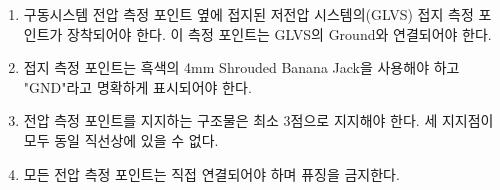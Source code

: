 \documentclass[final,a4paper,10pt]{report}
\begin{document}
\begin{enumerate}
  \item\label{rule:formula-technical.tractive-system-measuring-points.glvs-ground-point} 구동시스템 전압 측정 포인트 옆에 접지된 저전압 시스템의(GLVS) 접지 측정 포인트가 장착되어야 한다. 이 측정 포인트는 GLVS의 Ground와 연결되어야 한다.
  \item\label{rule:formula-technical.tractive-system-measuring-points.black-jack-gnd-label} 접지 측정 포인트는 흑색의 4mm Shrouded Banana Jack을 사용해야 하고 "GND"라고 명확하게 표시되어야 한다.
  \item\label{rule:formula-technical.tractive-system-measuring-points.min-3point-noncollinear-support} 전압 측정 포인트를 지지하는 구조물은 최소 3점으로 지지해야 한다. 세 지지점이 모두 동일 직선상에 있을 수 없다.
  \item\label{rule:formula-technical.tractive-system-measuring-points.direct-connection-no-fusing} 모든 전압 측정 포인트는 직접 연결되어야 하며 퓨징을 금지한다.
\end{enumerate}
\end{document}
